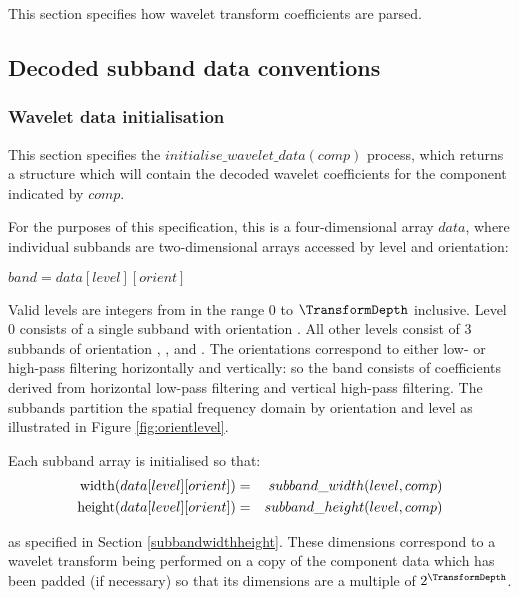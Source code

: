 
\label{transformdec}

This section specifies how wavelet transform coefficients are parsed.


\subsection{Decoded subband data conventions}
\label{wltdecodeconventions}

\subsubsection{Wavelet data initialisation}

\label{wltinit}

This section specifies the $initialise\_wavelet\_data(comp)$ process, which returns a structure which will
contain the decoded wavelet coefficients for the component indicated by $comp$. 

For the purposes of this specification, this is a four-dimensional array $data$,
where individual subbands are two-dimensional arrays accessed by level and orientation:

$band = data[level][orient]$

Valid levels are integers from in the range 0 to $\TransformDepth$ inclusive. 
Level 0 consists of a single subband with orientation \LL. 
All other levels consist of 3 subbands of orientation \LH, \HL, 
and \HH. The orientations correspond to either low- or high-pass filtering
horizontally and vertically: so the \LH band consists of coefficients derived
from horizontal low-pass filtering and vertical high-pass filtering. The subbands
partition the spatial frequency domain by orientation and level as illustrated
in Figure \ref{fig:orientlevel}.

Each subband array is initialised so that:
\begin{eqnarray*}
\operatorname{width}(data[level][orient]) & = & subband\_width(level,comp) \\
\operatorname{height}(data[level][orient]) & = & subband\_height(level,comp)
\end{eqnarray*}

as specified in Section \ref{subbandwidthheight}. These dimensions correspond 
to a wavelet transform being performed on a copy of the component data which 
has been padded (if necessary) so that its
dimensions are a multiple of $2^{\TransformDepth}$.

